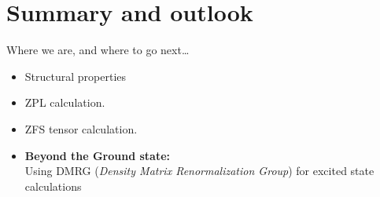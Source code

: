 \documentclass[notes=hide]{beamer}
\begin{document}
\section{Summary and outlook} %




\begin{frame}{Where we are, and where to go next\ldots}
  \begin{itemize}
    \item Structural properties
    \item ZPL calculation.
    \item ZFS tensor calculation.
    \item \textbf{Beyond the Ground state:}\\
      Using DMRG (\textit{Density Matrix Renormalization Group}) for excited state calculations
  \end{itemize}
\end{frame}




\end{document}
